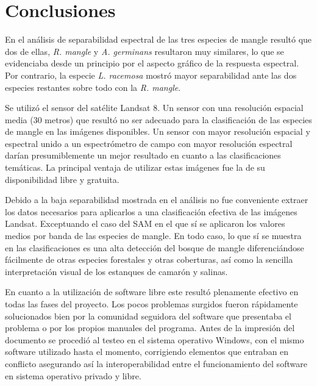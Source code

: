 


\chapter{Conclusiones}

En el análisis de separabilidad espectral de las tres especies de mangle resultó que dos de ellas, \textit{R. mangle} y \textit{A. germinans} resultaron muy similares, lo que se evidenciaba desde un principio por el aspecto gráfico de la respuesta espectral. Por contrario, la especie \textit{L. racemosa} mostró mayor separabilidad ante las dos especies restantes sobre todo con la \textit{R. mangle}.

Se utilizó el sensor del satélite Landsat 8. Un sensor con una resolución espacial media (30 metros) que resultó no ser adecuado para la clasificación de las especies de mangle en las imágenes disponibles. Un sensor con mayor resolución espacial y espectral unido a un espectrómetro de campo con mayor resolución espectral darían presumiblemente un mejor resultado en cuanto a las clasificaciones temáticas. La principal ventaja de utilizar estas imágenes fue la de su disponibilidad libre y gratuita.

Debido a la baja separabilidad mostrada en el análisis no fue conveniente extraer los datos necesarios para aplicarlos a una clasificación efectiva de las imágenes Landsat. Exceptuando el caso del \ac{SAM} en el que sí se aplicaron los valores medios por banda de las especies de mangle. En todo caso, lo que sí se muestra en las clasificaciones es una alta detección del bosque de mangle diferenciándose fácilmente de otras especies forestales y otras coberturas, así como la sencilla interpretación visual de los estanques de camarón y salinas.

En cuanto a la utilización de software libre este resultó plenamente efectivo en todas las fases del proyecto. Los pocos problemas surgidos fueron rápidamente solucionados bien por la comunidad seguidora del software que presentaba el problema o por los propios manuales del programa. Antes de la impresión del documento se procedió al testeo en el sistema operativo Windows, con el mismo software utilizado hasta el momento, corrigiendo elementos que entraban en conflicto asegurando así la interoperabilidad entre el funcionamiento del software en sistema operativo privado y libre.